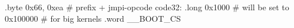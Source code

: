 \documentclass[varwidth=25.5em,crop]{standalone}
\begin{document}
\begin{gascode}
        .byte 0x66, 0xea # prefix + jmpi-opcode
code32: .long 0x1000     # will be set to 0x100000
                         # for big kernels
        .word __BOOT_CS
\end{gascode}
\end{document}
